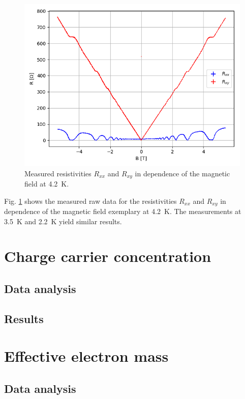 \documentclass[12pt,a4paper]{article}
\begin{document}
\begin{figure} [H]
\centering
\includegraphics[scale=0.8]{Bilder/Elektron_g/4_2/Rohdaten.PNG}
\caption{Measured resistivities $R_{xx}$ and $R_{xy}$ in dependence of the magnetic field at \SI{4.2}{K}.}
\label{fig:raw_data}
\end{figure}

Fig. \ref{fig:raw_data} shows the measured raw data for the resistivities $R_{xx}$ and $R_{xy}$ in dependence of the magnetic field exemplary at \SI{4.2}{K}. The measurements at \SI{3.5}{K} and \SI{2.2}{K} yield similar results.



\section{Charge carrier concentration}
\subsection{Data analysis}


\subsection{Results}


\section{Effective electron mass}
\subsection{Data analysis}
\end{document}
